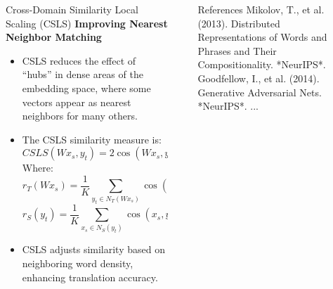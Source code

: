 \documentclass[final]{beamer}
\newlength{\sepwid}
\newlength{\onecolwid}
\newlength{\twocolwid}
\begin{document}
\begin{frame}[t]
\begin{columns}[t]
\begin{column}{\twocolwid}
\begin{block}{Cross-Domain Similarity Local Scaling (CSLS)}
    \textbf{Improving Nearest Neighbor Matching}
    \begin{itemize}
        \item CSLS reduces the effect of “hubs” in dense areas of the embedding space, where some vectors appear as nearest neighbors for many others.
        \item The CSLS similarity measure is:
        \begin{equation}
            CSLS(W x_s, y_t) = 2 \cos(W x_s, y_t) - r_T(W x_s) - r_S(y_t)
        \end{equation}
        Where:
        \begin{equation}
            r_T(W x_s) = \frac{1}{K} \sum_{y_t \in N_T(W x_s)} \cos(W x_s, y_t)
        \end{equation}
        \begin{equation}
            r_S(y_t) = \frac{1}{K} \sum_{x_s \in N_S(y_t)} \cos(x_s, y_t)
        \end{equation}
        \item CSLS adjusts similarity based on neighboring word density, enhancing translation accuracy.
    \end{itemize}
\end{block}

\end{column} 

\begin{column}{\sepwid}\end{column} 

\begin{column}{\onecolwid} 


\begin{block}{References}
\small
Mikolov, T., et al. (2013). Distributed Representations of Words and Phrases and Their Compositionality. *NeurIPS*.\\
Goodfellow, I., et al. (2014). Generative Adversarial Nets. *NeurIPS*.
...
\end{block}

\end{column}

\begin{column}{\sepwid}\end{column}

\end{columns}
\end{frame}
\end{document}
